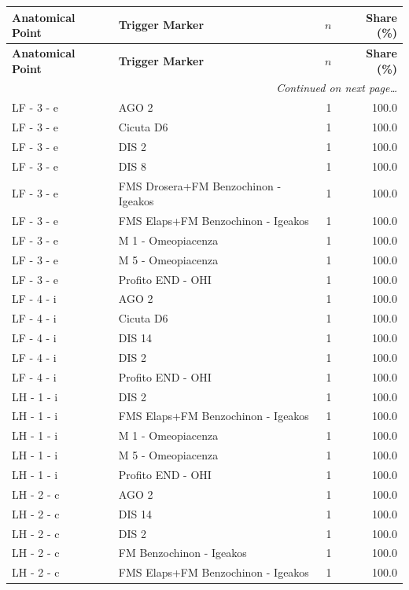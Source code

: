 \documentclass[a4paper,11pt]{article}
\begin{document}
\begin{footnotesize}
\begin{longtable}{p{3.5cm}p{7.5cm}rr}
\toprule
\textbf{Anatomical Point} &
\textbf{Trigger Marker} &
\textbf{$n$} &
\textbf{Share (\%)} \\
\midrule
\endfirsthead
\toprule
\textbf{Anatomical Point} &
\textbf{Trigger Marker} &
\textbf{$n$} &
\textbf{Share (\%)} \\
\midrule
\endhead
\midrule
\multicolumn{4}{r}{\footnotesize\emph{Continued on next page\ldots}} \\
\endfoot
\bottomrule
\endlastfoot
LF - 3 - e & AGO 2 & 1 & 100.0 \\
LF - 3 - e & Cicuta D6 & 1 & 100.0 \\
LF - 3 - e & DIS 2 & 1 & 100.0 \\
LF - 3 - e & DIS 8 & 1 & 100.0 \\
LF - 3 - e & FMS Drosera+FM Benzochinon - Igeakos & 1 & 100.0 \\
LF - 3 - e & FMS Elaps+FM Benzochinon - Igeakos & 1 & 100.0 \\
LF - 3 - e & M 1 - Omeopiacenza & 1 & 100.0 \\
LF - 3 - e & M 5 - Omeopiacenza & 1 & 100.0 \\
LF - 3 - e & Profito END - OHI & 1 & 100.0 \\
LF - 4 - i & AGO 2 & 1 & 100.0 \\
LF - 4 - i & Cicuta D6 & 1 & 100.0 \\
LF - 4 - i & DIS 14 & 1 & 100.0 \\
LF - 4 - i & DIS 2 & 1 & 100.0 \\
LF - 4 - i & Profito END - OHI & 1 & 100.0 \\
LH - 1 - i & DIS 2 & 1 & 100.0 \\
LH - 1 - i & FMS Elaps+FM Benzochinon - Igeakos & 1 & 100.0 \\
LH - 1 - i & M 1 - Omeopiacenza & 1 & 100.0 \\
LH - 1 - i & M 5 - Omeopiacenza & 1 & 100.0 \\
LH - 1 - i & Profito END - OHI & 1 & 100.0 \\
LH - 2 - c & AGO 2 & 1 & 100.0 \\
LH - 2 - c & DIS 14 & 1 & 100.0 \\
LH - 2 - c & DIS 2 & 1 & 100.0 \\
LH - 2 - c & FM Benzochinon - Igeakos & 1 & 100.0 \\
LH - 2 - c & FMS Elaps+FM Benzochinon - Igeakos & 1 & 100.0 \\

\end{longtable}
\end{footnotesize}
\end{document}
